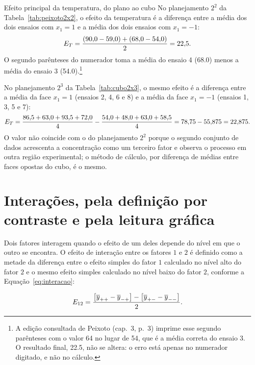 \documentclass{doeapostila}
\begin{document}
\begin{aplicacao}{Efeito principal da temperatura, do plano ao cubo}
  No planejamento $2^{2}$ da Tabela~\ref{tab:peixoto2x2}, o efeito da
  temperatura é a diferença entre a média dos dois ensaios com $x_{1} = 1$ e
  a média dos dois ensaios com $x_{1} = -1$:
  \[
    E_{T} = \frac{(90{,}0 - 59{,}0) + (68{,}0 - 54{,}0)}{2} = 22{,}5 .
  \]
  O segundo parênteses do numerador toma a média do ensaio 4 (\num{68.0})
  menos a média do ensaio 3 (\num{54.0}).\footnote{A edição consultada de
  Peixoto (cap.~3, p.~3) imprime esse segundo parênteses com o valor
  \num{64} no lugar de \num{54}, que é a média correta do ensaio 3. O
  resultado final, \num{22.5}, não se altera: o erro está apenas no
  numerador digitado, e não no cálculo.}

  No planejamento $2^{3}$ da Tabela~\ref{tab:cubo2x3}, o mesmo efeito é a
  diferença entre a média da face $x_{1} = 1$ (ensaios 2, 4, 6 e 8) e a
  média da face $x_{1} = -1$ (ensaios 1, 3, 5 e 7):
  \[
    E_{T} = \frac{86{,}5 + 63{,}0 + 93{,}5 + 72{,}0}{4}
               - \frac{54{,}0 + 48{,}0 + 63{,}0 + 58{,}5}{4}
               = 78{,}75 - 55{,}875 = 22{,}875 .
  \]
  O valor não coincide com o do planejamento $2^{2}$ porque o segundo
  conjunto de dados acrescenta a concentração como um terceiro fator e
  observa o processo em outra região experimental; o método de cálculo, por
  diferença de médias entre faces opostas do cubo, é o mesmo.
\end{aplicacao}

\section{Interações, pela definição por contraste e pela leitura gráfica}
\label{sec:interacoes}

Dois fatores interagem quando o efeito de um deles depende do nível em que o
outro se encontra. O efeito de interação entre os fatores $1$ e $2$ é
definido como a metade da diferença entre o efeito simples do fator $1$
calculado no nível alto do fator $2$ e o mesmo efeito simples calculado no
nível baixo do fator $2$, conforme a Equação~\eqref{eq:interacao}:

\begin{equation}
  E_{12} = \frac{
    \left[ \overline{y}_{++} - \overline{y}_{-+} \right]
    - \left[ \overline{y}_{+-} - \overline{y}_{--} \right]
  }{2} .
  \label{eq:interacao}
\end{equation}
\end{document}
